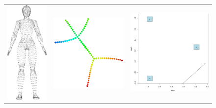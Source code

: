 \begin{figure}
\begin{tabular}{ccc}
\includegraphics[width=2.5cm]{figures/1} & \includegraphics[width=4.5cm]{figures/1_mappercoord2_subs100_g40.pdf} & \includegraphics[width=5cm]{figures/1_conf85_boot100.pdf} \\

\end{tabular}
\end{figure}
